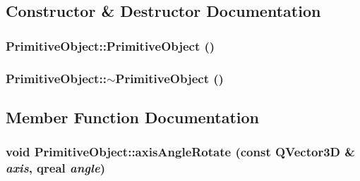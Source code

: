 \subsection{Constructor \& Destructor Documentation}
\hypertarget{class_robot_model_1_1_primitive_object_ad8db4622c9ec75d92c70f4fba00863bf}{
\subsubsection[{PrimitiveObject}]{\setlength{\rightskip}{0pt plus 5cm}PrimitiveObject::PrimitiveObject ()}}
\label{class_robot_model_1_1_primitive_object_ad8db4622c9ec75d92c70f4fba00863bf}
\hypertarget{class_robot_model_1_1_primitive_object_a30e56bb8d777bf91ec7627fdfa0073b2}{
\subsubsection[{$\sim$PrimitiveObject}]{\setlength{\rightskip}{0pt plus 5cm}PrimitiveObject::$\sim$PrimitiveObject ()}}
\label{class_robot_model_1_1_primitive_object_a30e56bb8d777bf91ec7627fdfa0073b2}


\subsection{Member Function Documentation}
\hypertarget{class_robot_model_1_1_primitive_object_a97b449302680b96410ff7296c794f640}{
\subsubsection[{axisAngleRotate}]{\setlength{\rightskip}{0pt plus 5cm}void PrimitiveObject::axisAngleRotate (const QVector3D \& {\em axis}, \/  qreal {\em angle})}}
\label{class_robot_model_1_1_primitive_object_a97b449302680b96410ff7296c794f640}



